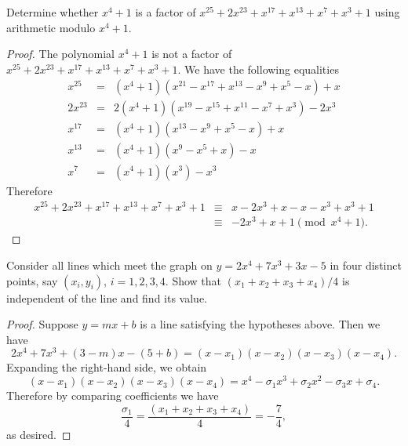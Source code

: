 \documentclass[10pt]{amsart}
\begin{document}
\begin{thm}\label{ex4}
  Determine whether $x^4 + 1$ is a factor of $x^{25} + 2x^{23} + x^{17} + x^{13} + x^7 + x^3 + 1$ using arithmetic modulo $x^4 + 1$.
  
  \begin{proof}
    The polynomial $x^4 + 1$ is not a factor of $x^{25} + 2x^{23} + x^{17} + x^{13} + x^7 + x^3 + 1$.
    We have the following equalities
    \begin{eqnarray*}
      x^{25} &=& (x^4 + 1)(x^{21} - x^{17} + x^{13} - x^9 + x^5 - x) + x\\
      2x^{23} &=& 2(x^4 + 1)(x^{19} - x^{15} + x^{11} - x^7 + x^3) - 2x^3\\
      x^{17} &=& (x^4 + 1)(x^{13} - x^9 + x^5 - x) + x\\
      x^{13} &=& (x^4 + 1)(x^9 - x^5 + x) - x\\
      x^7 &=& (x^4 + 1)(x^3) - x^3
    \end{eqnarray*}
    Therefore 
    \begin{eqnarray*}
      x^{25} + 2x^{23} + x^17 + x^13 + x^7 + x^3 + 1 &\equiv& x - 2x^3 + x - x - x^3 + x^3 + 1\\
      &\equiv& -2x^3 + x + 1 \pmod{x^4 + 1}.
    \end{eqnarray*}
  \end{proof}
\end{thm}

\begin{thm}\label{ex5}
  Consider all lines which meet the graph on $y = 2x^4 + 7x^3 + 3x - 5$ in four distinct points, say $(x_i, y_i)$, $i = 1, 2, 3, 4$.
  Show that $(x_1 + x_2 + x_3 + x_4)/4$ is independent of the line and find its value.
  
  \begin{proof}
    Suppose $y = mx + b$ is a line satisfying the hypotheses above.
    Then we have
    $$2x^4 + 7x^3 + (3 - m)x - (5 + b) = (x - x_1)(x - x_2)(x - x_3)(x - x_4).$$ 
    Expanding the right-hand side, we obtain
    $$(x - x_1)(x - x_2)(x - x_3)(x - x_4) = x^4 - \sigma_1 x^3 + \sigma_2 x^2 - \sigma_3 x + \sigma_4.$$
    Therefore by comparing coefficients we have
    $$\frac{\sigma_1}{4} = \frac{(x_1 + x_2 + x_3 + x_4)}{4} = -\frac{7}{4},$$
    as desired.
  \end{proof}
\end{thm}
\end{document}
